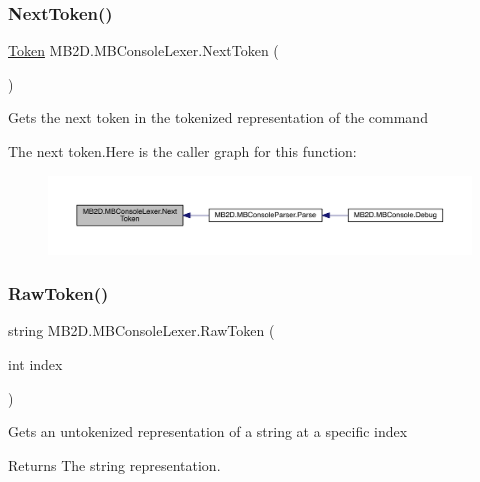 \subsubsection{\texorpdfstring{Next\+Token()}{NextToken()}}
{\footnotesize\ttfamily \hyperlink{namespace_m_b2_d_ab170e7e7db86e5ccb0ae156c0d9a6002}{Token} M\+B2\+D.\+M\+B\+Console\+Lexer.\+Next\+Token (\begin{DoxyParamCaption}{ }\end{DoxyParamCaption})\hspace{0.3cm}{\ttfamily [inline]}}



Gets the next token in the tokenized representation of the command 

The next token.Here is the caller graph for this function\+:
\nopagebreak
\begin{figure}[H]
\begin{center}
\leavevmode
\includegraphics[width=350pt]{class_m_b2_d_1_1_m_b_console_lexer_ab083ced0d68a7f7278fbb462a9c60410_icgraph}
\end{center}
\end{figure}
\hypertarget{class_m_b2_d_1_1_m_b_console_lexer_a9f08e0a2739eb027f6b8c46abe67f647}{}\label{class_m_b2_d_1_1_m_b_console_lexer_a9f08e0a2739eb027f6b8c46abe67f647} 
\subsubsection{\texorpdfstring{Raw\+Token()}{RawToken()}}
{\footnotesize\ttfamily string M\+B2\+D.\+M\+B\+Console\+Lexer.\+Raw\+Token (\begin{DoxyParamCaption}\item[{int}]{index }\end{DoxyParamCaption})\hspace{0.3cm}{\ttfamily [inline]}}



Gets an untokenized representation of a string at a specific index 

\begin{DoxyReturn}{Returns}
The string representation.
\end{DoxyReturn}

